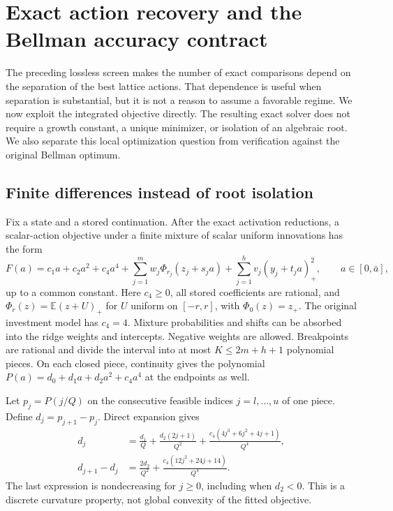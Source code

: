 \section{Exact action recovery and the Bellman accuracy contract}\label{sec:search60}
The preceding lossless screen makes the number of exact comparisons depend on the separation of the best lattice actions. That dependence is useful when separation is substantial, but it is not a reason to assume a favorable regime. We now exploit the integrated objective directly. The resulting exact solver does not require a growth constant, a unique minimizer, or isolation of an algebraic root. We also separate this local optimization question from verification against the original Bellman optimum.

\subsection{Finite differences instead of root isolation}
Fix a state and a stored continuation. After the exact activation reductions, a scalar-action objective under a finite mixture of scalar uniform innovations has the form
\begin{equation}\label{eq:objective60}
 F(a)=c_1a+c_2a^2+c_4a^4
      +\sum_{j=1}^{m}w_j\Phi_{r_j}(z_j+s_ja)
      +\sum_{j=1}^{h}v_j(y_j+t_ja)_+^2,
 \qquad a\in[0,\bar a],
\end{equation}
up to a common constant. Here $c_4\ge0$, all stored coefficients are rational, and $\Phi_r(z)=\mathbb E(z+U)_+$ for $U$ uniform on $[-r,r]$, with $\Phi_0(z)=z_+$. The original investment model has $c_4=4$. Mixture probabilities and shifts can be absorbed into the ridge weights and intercepts. Negative weights are allowed. Breakpoints are rational and divide the interval into at most $K\le 2m+h+1$ polynomial pieces. On each closed piece, continuity gives the polynomial $P(a)=d_0+d_1a+d_2a^2+c_4a^4$ at the endpoints as well.

Let $p_j=P(j/Q)$ on the consecutive feasible indices $j=l,\ldots,u$ of one piece. Define $d_j=p_{j+1}-p_j$. Direct expansion gives
\begin{align}
 d_j&=\frac{d_1}{Q}+\frac{d_2(2j+1)}{Q^2}
       +\frac{c_4(4j^3+6j^2+4j+1)}{Q^4},\label{eq:first-difference60}\\
 d_{j+1}-d_j&=\frac{2d_2}{Q^2}
       +\frac{c_4(12j^2+24j+14)}{Q^4}.\label{eq:second-difference60}
\end{align}
The last expression is nondecreasing for $j\ge0$, including when $d_2<0$. This is a discrete curvature property, not global convexity of the fitted objective.

